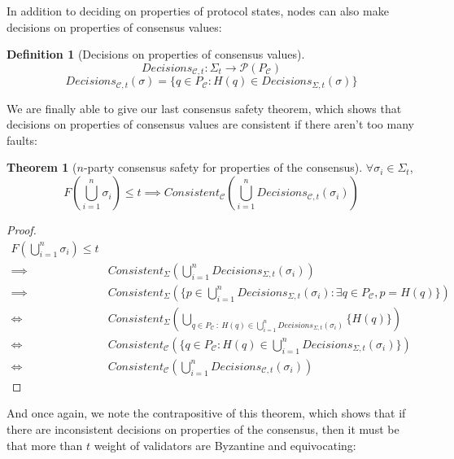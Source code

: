 \documentclass{article}
\theoremstyle{definition}
\newtheorem{thm}{Theorem}
\newtheorem{defn}{Definition}[section]
\begin{document}
In addition to deciding on properties of protocol states, nodes can also make decisions on properties of consensus values:

\begin{defn}[Decisions on properties of consensus values]
$$Decisions_{\mathcal{C},t} : \Sigma_t \to \mathcal{P}(P_{\mathcal{C}})$$
$$Decisions_{\mathcal{C},t}(\sigma) = \{q \in P_{\mathcal{C}}: H(q) \in Decisions_{\Sigma,t}(\sigma)\}$$
\end{defn}

We are finally able to give our last consensus safety theorem, which shows that decisions on properties of consensus values are consistent if there aren't too many faults:

\begin{thm}[$n$-party consensus safety for properties of the consensus]
$\forall \sigma_i \in \Sigma_t$,
$$F(\bigcup_{i=1}^n \sigma_i) \leq t \implies Consistent_{\mathcal{C}}(\bigcup_{i=1}^n Decisions_{\mathcal{C},t}(\sigma_i))$$
\end{thm}


\begin{proof}
\begin{align}
F(\bigcup_{i=1}^n \sigma_i) \leq t\\
\implies&   Consistent_\Sigma(\bigcup_{i=1}^n Decisions_{\Sigma,t}(\sigma_i)) \\
\implies&   Consistent_\Sigma(\{ p \in \bigcup_{i=1}^n  Decisions_{\Sigma,t}(\sigma_i): \exists q \in P_{\mathcal{C}}, p = H(q)\})\\
\iff&   Consistent_\Sigma(\bigcup_{q \in P_{\mathcal{C}} ~:~ H(q) \in \bigcup_{i=1}^n Decisions_{\Sigma,t}(\sigma_i)} \{H(q)\} )\\
\iff& Consistent_{\mathcal{C}}(\{q \in P_{\mathcal{C}}: H(q) \in \bigcup_{i=1}^n Decisions_{\Sigma,t}(\sigma_i)\}) \\
\iff& Consistent_{\mathcal{C}}(\bigcup_{i=1}^n Decisions_{\mathcal{C},t}(\sigma_i))
\end{align}
\end{proof}

And once again, we note the contrapositive of this theorem, which shows that if there are inconsistent decisions on properties of the consensus, then it must be that more than $t$ weight of validators are Byzantine and equivocating:
\end{document}
